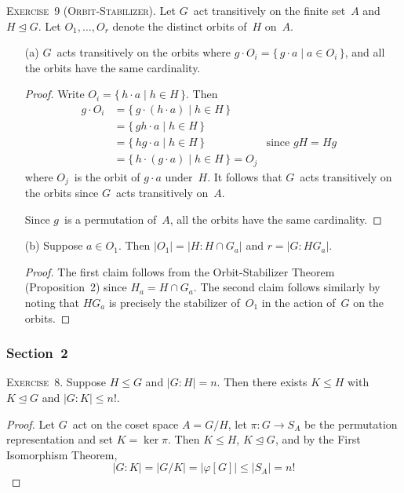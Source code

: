 \documentclass[letterpaper]{article}
\newcommand{\exercise}[1]{\goodbreak\noindent\textsc{Exercise~{#1}.}}
\newcommand{\sect}{\cap}
\newcommand{\subgroup}{\le}
\newcommand{\normal}{\trianglelefteq}
\newcommand{\ord}[1]{|{#1}|}
\newcommand{\gindex}[2]{|{#1}:{#2}|}
\begin{document}
\bigskip
\exercise{9 (Orbit-Stabilizer)}
Let $G$~act transitively on the finite set~$A$ and $H\normal G$. Let $O_1,\ldots,O_r$ denote the distinct orbits of~$H$ on~$A$.
\begin{enumerate}[itemsep=0pt]
\item[(a)] $G$~acts transitively on the orbits where $g\cdot O_i=\{\,g\cdot a\mid a\in O_i\,\}$, and all the orbits have the same cardinality.
\begin{proof}
Write $O_i=\{\,h\cdot a\mid h\in H\,\}$. Then
\begin{align*}
g\cdot O_i&=\{\,g\cdot(h\cdot a)\mid h\in H\,\}&&\\
	&=\{\,gh\cdot a\mid h\in H\,\}&&\\
	&=\{\,hg\cdot a\mid h\in H\,\}&\text{since }gH=Hg\\
	&=\{\,h\cdot(g\cdot a)\mid h\in H\,\}=O_j
\end{align*}
where $O_j$~is the orbit of $g\cdot a$ under~$H$. It follows that $G$~acts transitively on the orbits since $G$~acts transitively on~$A$.

Since $g$~is a permutation of~$A$, all the orbits have the same cardinality.
\end{proof}
\item[(b)] Suppose $a\in O_1$. Then $\ord{O_1}=\gindex{H}{H\sect G_a}$ and $r=\gindex{G}{HG_a}$.
\begin{proof}
The first claim follows from the Orbit-Stabilizer Theorem (Proposition~2) since $H_a=H\sect G_a$. The second claim follows similarly by noting that $HG_a$ is precisely the stabilizer of~$O_1$ in the action of~$G$ on the orbits.
\end{proof}
\end{enumerate}

\subsubsection*{Section~2}
\exercise{8}
Suppose $H\subgroup G$ and $\gindex{G}{H}=n$. Then there exists $K\subgroup H$ with $K\normal G$ and $\gindex{G}{K}\le n!$.
\begin{proof}
Let $G$~act on the coset space $A=G/H$, let $\pi:G\to S_A$ be the permutation representation and set $K=\ker\pi$. Then $K\subgroup H$, $K\normal G$, and by the First Isomorphism Theorem,
$$\gindex{G}{K}=\ord{G/K}=\ord{\varphi[G]}\le\ord{S_A}=n!$$
\end{proof}
\end{document}
